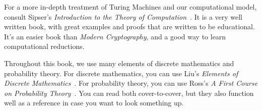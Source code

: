 For a more in-depth treatment of Turing Machines and our computational model, consult Sipser's
\emph{Introduction to the Theory of Computation}~\cite{sipser}. It is a very well written book,
with great examples and proofs that are written to be educational. It's an easier book than
\emph{Modern Cryptography}, and a good way to learn computational reductions.

Throughout this book, we use many elements of discrete mathematics and probability theory. For
discrete mathematics, you can use Liu's \emph{Elements of Discrete Mathematics}~\cite{liu}.
For probability theory, you can use Ross's
\emph{A First Course on Probability Theory}~\cite{ross}. You can read both cover-to-cover, but
they also function well as a reference in case you want to look something up.
